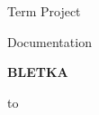 \begin{titlepage}
\begin{center}

\large
Term Project

\medskip
Documentation

\vfill

{\huge\bf BLETKA}

\vfill

\hbox to 

\end{center}
\end{titlepage}
